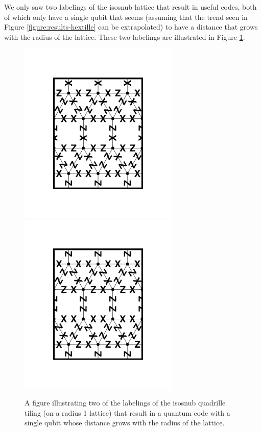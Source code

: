 \documentclass[12pt]{amsbook}
\theoremstyle{plain}
\theoremstyle{definition}
\theoremstyle{remark}
\begin{document}
We only saw two labelings of the isosnub lattice that result in useful codes, both of which only have a single qubit that seems (assuming that the trend seen in Figure \ref{figure:results-hextille} can be extrapolated) to have a distance that grows with the radius of the lattice.  These two labelings are illustrated in Figure \ref{figure:isosnub-quadrille-code-r-labeling}.

\begin{figure}
\includegraphics[width=3in]{images/isosnub-quadrille-code-labeling-1} %
\includegraphics[width=3in]{images/isosnub-quadrille-code-labeling-2} %
\caption{
\label{figure:isosnub-quadrille-code-r-labeling}
A figure illustrating two of the labelings of the isosnub quadrille tiling (on a radius 1 lattice) that result in a quantum code with a single qubit whose distance grows with the radius of the lattice.
}
\end{figure}
\end{document}
